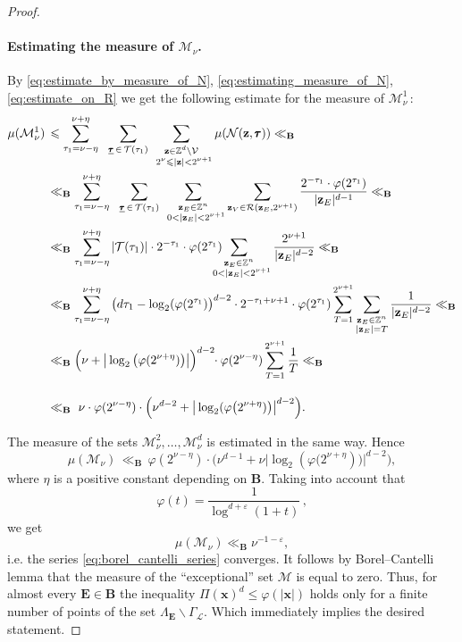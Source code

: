 \documentclass[10pt,a4paper]{amsart}
\newcommand{\Ga}{\Gamma}
\newcommand{\La}{\Lambda}
\newcommand{\Z}{\mathbb{Z}}
\newcommand{\bB}{\mathbf{B}}
\newcommand{\bE}{\mathbf{E}}
\newcommand{\cL}{\mathcal{L}}
\newcommand{\cM}{\mathcal{M}}
\newcommand{\cN}{\mathcal{N}}
\newcommand{\cR}{\mathcal{R}}
\newcommand{\cT}{\mathcal{T}}
\newcommand{\cV}{\mathcal{V}}
\newcommand{\e}{\varepsilon}
\renewcommand{\leq}{\leqslant}
\renewcommand{\vec}[1]{\mathbf{#1}}
\begin{document}
\begin{proof}
  \paragraph{Estimating the measure of $\cM_\nu$.}
  
  By \eqref{eq:estimate_by_measure_of_N}, \eqref{eq:estimating_measure_of_N}, \eqref{eq:estimate_on_R} we get the following estimate for the measure of $\cM^1_\nu$\,:
  \begin{align*}
    \mu(\cM^1_\nu)\, & \leq
    \sum_{\tau_1=\nu-\eta}^{\nu+\eta}\phantom{1}
    \sum_{\underline{\pmb\tau}\,\in\,\cT(\tau_1)}
    \sum_{\substack{\vec z\in\Z^d\backslash\cV \\ 
                    \,\ 2^\nu\leq|\vec z|<2^{\nu+1}}}
    \mu(\cN(\vec z,\pmb\tau))
    \ll_\bB \\ & \ll_\bB
    \sum_{\tau_1=\nu-\eta}^{\nu+\eta}\phantom{1}
    \sum_{\underline{\pmb\tau}\,\in\,\cT(\tau_1)}
    \sum_{\substack{\vec z_E\in\Z^n \\ 
                    \,\ 0<|\vec z_E|<2^{\nu+1}}}
    \sum_{\vec z_V\in\cR(\vec z_E,2^{\nu+1})}
    \frac{2^{-\tau_1}\cdot\varphi(2^{\tau_1})}{|\vec z_E|^{d-1}}
    \ll_\bB \\ & \ll_\bB
    \sum_{\tau_1=\nu-\eta}^{\nu+\eta}
    |\cT(\tau_1)|\cdot2^{-\tau_1}\cdot\varphi(2^{\tau_1})
    \hskip-5mm
    \sum_{\substack{\vec z_E\in\Z^n \\ 
                    \,\ 0<|\vec z_E|<2^{\nu+1}}}
    \frac{2^{\nu+1}}{|\vec z_E|^{d-2}}
    \ll_\bB \\ & \ll_\bB
    \sum_{\tau_1=\nu-\eta}^{\nu+\eta}
    \big(d\tau_1-\log_2(\varphi(2^{\tau_1})\big)^{d-2}\cdot2^{-\tau_1+\nu+1}\cdot\varphi(2^{\tau_1})
    \sum_{T=1}^{2^{\nu+1}}
    \sum_{\substack{\vec z_E\in\Z^n \\ 
                    |\vec z_E|=T}}
    \frac1{|\vec z_E|^{d-2}}
    \ll_\bB \\ & \ll_\bB
    \Big(\nu+\big|\log_2\big(\varphi(2^{\nu+\eta})\big)\big|\Big)^{d-2}\hskip-1mm\cdot\varphi(2^{\nu-\eta})
    \sum_{T=1}^{2^{\nu+1}}\frac1T
    \ll_\bB \\ & \ll_\bB
    \ \nu\cdot\varphi(2^{\nu-\eta})\cdot\Big(\nu^{d-2}+\big|\log_2(\varphi\big(2^{\nu+\eta})\big)\big|^{d-2}\Big).
    \vphantom{\frac{\Big|}{}}
  \end{align*}
  
  The measure of the sets $\cM^2_\nu,\ldots,\cM^d_\nu$ is estimated in the same way. Hence
  \[
    \mu(\cM_\nu)\,\ll_\bB\,
    \varphi(2^{\nu-\eta})\cdot\Big(\nu^{d-1}+\nu\big|\log_2(\varphi\big(2^{\nu+\eta})\big)\big|^{d-2}\Big),
  \]
  where $\eta$ is a positive constant depending on $\bB$. Taking into account that
  \[
    \varphi(t)=\frac1{\log^{d+\e}(1+t)}\,,
  \]
  we get
  \[
    \mu(\cM_\nu)\ll_\bB\nu^{-1-\e},
  \]
  i.e. the series \eqref{eq:borel_cantelli_series} converges. It follows by Borel--Cantelli lemma that the measure of the ``exceptional'' set $\cM$ is equal to zero. Thus, for almost every $\bE\in\bB$ the inequality $\Pi(\vec x)^d\leq\varphi(|\vec x|)$ holds only for a finite number of points of the set $\La_\bE\backslash\Ga_\cL$. Which immediately implies the desired statement.
\end{proof}
\end{document}
